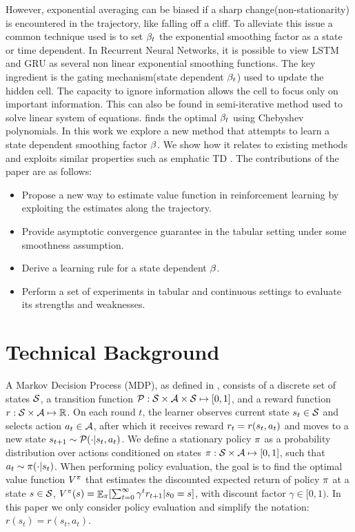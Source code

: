 However, exponential averaging can be biased if a sharp change(non-stationarity) is encountered in the trajectory, like falling off a cliff. To alleviate this issue a common technique used is to set $\beta_t$ the exponential smoothing factor as a state or time dependent. In Recurrent Neural Networks, it is possible to view LSTM \cite{hochreiter1997long} and GRU \cite{chung2014empirical} as several non linear exponential smoothing functions. The key ingredient is the gating mechanism(state dependent $\beta_t$) used to update the hidden cell. The capacity to ignore information allows the cell to focus only on important information. This can also be found in semi-iterative method used to solve linear system of equations. \cite{golub1961chebyshev} finds the optimal $\beta_t$ using Chebyshev polynomials. In this work we explore a new method that attempts to learn a state dependent smoothing factor $\beta$. We show how it relates to existing methods and exploits similar properties such as emphatic TD \cite{sutton2016emphatic,mahmood2015emphatic}. 
The contributions of the paper are as follows:
\begin{itemize}
    \setlength\itemsep{0.1em}
    \item Propose a new way to estimate value function in reinforcement learning by exploiting the estimates along the trajectory.
    \item Provide asymptotic convergence guarantee in the tabular setting under some smoothness assumption.
    \item Derive a learning rule for a state dependent $\beta$.
    \item Perform a set of experiments in tabular and continuous settings to evaluate its strengths and weaknesses.
\end{itemize}

\section{Technical Background}
A Markov Decision Process (MDP), as defined in \cite{puterman2014markov}, consists of a discrete set of states $\mathcal{S}$, a transition function $\mathcal{P} : \mathcal{S} \times \mathcal{A} \times \mathcal{S} \mapsto [0,1]$, and a reward function $r : \mathcal{S} \times \mathcal{A} \mapsto \mathbb{R}$. On each round $t$, the learner observes current state $s_t\in\mathcal{S}$ and selects action $a_t\in\mathcal{A}$, after which it receives reward $r_t = r(s_t,a_t)$ and moves to a new state $s_{t+1}\sim \mathcal{P}(\cdot|s_t, a_t)$. We define a stationary policy $\pi$ as a probability distribution over actions conditioned on states $\pi : \mathcal{S} \times \mathcal{A} \mapsto [0,1]$, such that $a_t \sim \pi(\cdot|s_t)$. 
When performing policy evaluation, the goal is to find the optimal value function $V^{\pi}$ that estimates the discounted expected return of policy $\pi$ at a state $s\in\mathcal{S}$, $V^{\pi}(s) =\mathop{\mathbb{E}}_{\pi}[\sum_{t=0}^{\infty} \gamma^t r_{t+1} | s_0 = s]$, with discount factor $\gamma \in [0,1)$. In this paper we only consider policy evaluation and simplify the notation: $r(s_t)=r(s_t,a_t)$.

